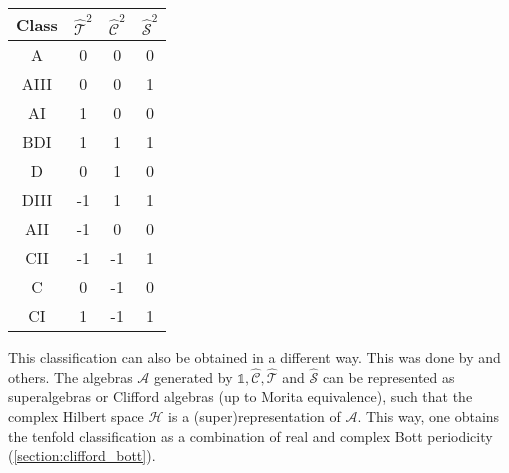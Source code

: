     \begin{table}[ht!]
        \centering
        \begin{tabular}{c|ccc}
            \hline
            Class\footnotemark&$\widehat{\mathcal{T}}^2$&$\widehat{\mathcal{C}}^2$&$\widehat{\mathcal{S}}^2$\\
            \hline
            A&0&0&0\\
            AIII&0&0&1\\
            \hdashline
            AI&1&0&0\\
            BDI&1&1&1\\
            D&0&1&0\\
            DIII&-1&1&1\\
            AII&-1&0&0\\
            CII&-1&-1&1\\
            C&0&-1&0\\
            CI&1&-1&1\\
            \hline
        \end{tabular}
    \end{table}

    This classification can also be obtained in a different way. This was done by  and others. The algebras $\mathcal{A}$ generated by $\mathbb{1},\widehat{\mathcal{C}},\widehat{\mathcal{T}}$ and $\widehat{\mathcal{S}}$ can be represented as superalgebras or Clifford algebras (up to Morita equivalence), such that the complex Hilbert space $\mathcal{H}$ is a (super)representation of $\mathcal{A}$. This way, one obtains the tenfold classification as a combination of real and complex Bott periodicity (\cref{section:clifford_bott}).

